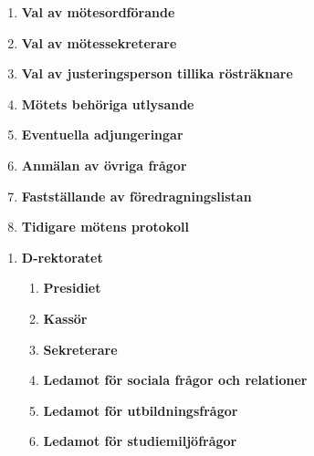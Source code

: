 \documentclass{protokoll}
\begin{document}
\begin{motesfakta} %
  \narvarande
\end{motesfakta}




  \begin{enumerate}
    \item\textbf{Val av mötesordförande}
    \item\textbf{Val av mötessekreterare}
    \item\textbf{Val av justeringsperson tillika rösträknare}
    \item\textbf{Mötets behöriga utlysande}
    \item\textbf{Eventuella adjungeringar}
    \item\textbf{Anmälan av övriga frågor}
    \item\textbf{Fastställande av föredragningslistan}
    \item\textbf{Tidigare mötens protokoll}
  \end{enumerate}


  \begin{enumerate}
    \item \textbf{D-rektoratet}
      \begin{enumerate}
        \item \textbf{Presidiet}
        \item \textbf{Kassör}
        \item \textbf{Sekreterare}
        \item \textbf{Ledamot för sociala frågor och relationer}
        \item \textbf{Ledamot för utbildningsfrågor}
        \item \textbf{Ledamot för studiemiljöfrågor}
      \end{enumerate}
  \end{enumerate}
\end{document}

